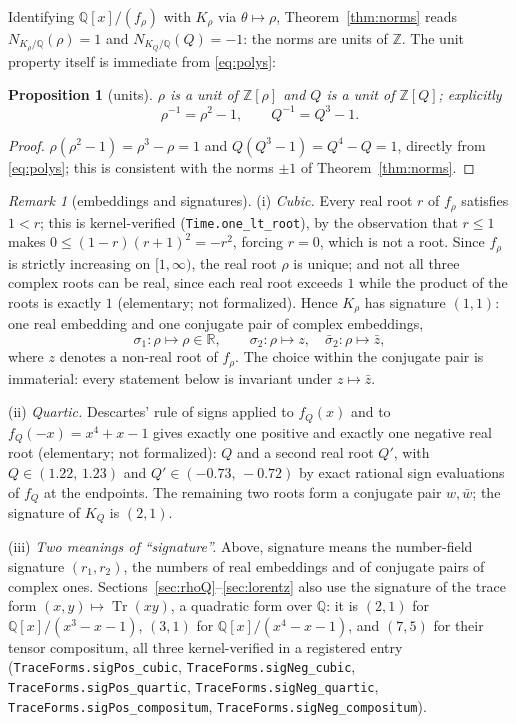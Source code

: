 \documentclass[11pt]{amsart}
\theoremstyle{plain}
\newtheorem{proposition}[theorem]{Proposition}
\theoremstyle{definition}
\theoremstyle{remark}
\newtheorem{remark}[theorem]{Remark}
\begin{document}
Identifying $\mathbb{Q}[x]/(f_{\rho})$ with $K_{\rho}$ via $\theta \mapsto \rho$, Theorem~\ref{thm:norms} reads $N_{K_{\rho}/\mathbb{Q}}(\rho) = 1$ and $N_{K_{Q}/\mathbb{Q}}(Q) = -1$: the norms are units of $\mathbb{Z}$. The unit property itself is immediate from \eqref{eq:polys}:

\begin{proposition}[units]\label{prop:units}
$\rho$ is a unit of $\mathbb{Z}[\rho]$ and $Q$ is a unit of $\mathbb{Z}[Q]$; explicitly
\[
  \rho^{-1} = \rho^2 - 1, \qquad Q^{-1} = Q^3 - 1 .
\]
\end{proposition}

\begin{proof}
$\rho(\rho^2 - 1) = \rho^3 - \rho = 1$ and $Q(Q^3 - 1) = Q^4 - Q = 1$, directly from \eqref{eq:polys}; this is consistent with the norms $\pm 1$ of Theorem~\ref{thm:norms}.
\end{proof}

\begin{remark}[embeddings and signatures]\label{rem:signatures}
(i) \emph{Cubic.} Every real root $r$ of $f_{\rho}$ satisfies $1 < r$; this is kernel-verified \textup{(\texttt{Time.one\_lt\_root})}, by the observation that $r \le 1$ makes $0 \le (1-r)(r+1)^2 = -r^2$, forcing $r = 0$, which is not a root. Since $f_{\rho}$ is strictly increasing on $[1, \infty)$, the real root $\rho$ is unique; and not all three complex roots can be real, since each real root exceeds $1$ while the product of the roots is exactly $1$ (elementary; not formalized). Hence $K_{\rho}$ has signature $(1,1)$: one real embedding and one conjugate pair of complex embeddings,
\[
  \sigma_1 : \rho \mapsto \rho \in \mathbb{R},
  \qquad
  \sigma_2 : \rho \mapsto z, \quad \bar\sigma_2 : \rho \mapsto \bar z,
\]
where $z$ denotes a non-real root of $f_{\rho}$. The choice within the conjugate pair is immaterial: every statement below is invariant under $z \mapsto \bar z$.

(ii) \emph{Quartic.} Descartes' rule of signs applied to $f_{Q}(x)$ and to $f_{Q}(-x) = x^4 + x - 1$ gives exactly one positive and exactly one negative real root (elementary; not formalized): $Q$ and a second real root $Q'$, with $Q \in (1.22,\, 1.23)$ and $Q' \in (-0.73,\, -0.72)$ by exact rational sign evaluations of $f_Q$ at the endpoints. The remaining two roots form a conjugate pair $w, \bar w$; the signature of $K_{Q}$ is $(2,1)$.

(iii) \emph{Two meanings of ``signature''.} Above, signature means the number-field signature $(r_1, r_2)$, the numbers of real embeddings and of conjugate pairs of complex ones. Sections~\ref{sec:rhoQ}--\ref{sec:lorentz} also use the signature of the trace form $(x, y) \mapsto \operatorname{Tr}(xy)$, a quadratic form over $\mathbb{Q}$: it is $(2,1)$ for $\mathbb{Q}[x]/(x^3 - x - 1)$, $(3,1)$ for $\mathbb{Q}[x]/(x^4 - x - 1)$, and $(7,5)$ for their tensor compositum, all three kernel-verified in a registered entry \cite{palomar-trace} (\texttt{TraceForms.sigPos\_cubic}, \texttt{TraceForms.sigNeg\_cubic}, \texttt{TraceForms.sigPos\_quartic}, \texttt{TraceForms.sigNeg\_quartic}, \texttt{TraceForms.sigPos\_compositum}, \texttt{TraceForms.sigNeg\_compositum}).
\end{remark}
\end{document}
